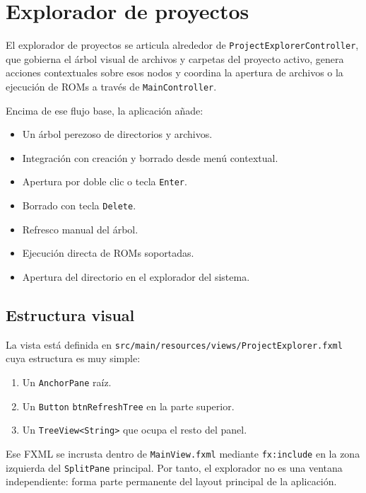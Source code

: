 \documentclass[../../main.tex]{subfiles}
\begin{document}
\clearpage

\section{Explorador de proyectos}

El explorador de proyectos se articula alrededor de \lstinline|ProjectExplorerController|, que gobierna el árbol visual de archivos y carpetas del proyecto activo, genera acciones contextuales sobre esos nodos y coordina la apertura de archivos o la ejecución de ROMs a través de \lstinline|MainController|.

Encima de ese flujo base, la aplicación añade:

\begin{itemize}
    \item Un árbol perezoso de directorios y archivos.
    \item Integración con creación y borrado desde menú contextual.
    \item Apertura por doble clic o tecla \lstinline|Enter|.
    \item Borrado con tecla \lstinline|Delete|.
    \item Refresco manual del árbol.
    \item Ejecución directa de ROMs soportadas.
    \item Apertura del directorio en el explorador del sistema.
\end{itemize}

\subsection{Estructura visual}

La vista está definida en \lstinline|src/main/resources/views/ProjectExplorer.fxml| cuya estructura es muy simple:

\begin{enumerate}
    \item Un \lstinline|AnchorPane| raíz.
    \item Un \lstinline|Button| \lstinline|btnRefreshTree| en la parte superior.
    \item Un \lstinline|TreeView<String>| que ocupa el resto del panel.
\end{enumerate}

Ese FXML se incrusta dentro de \lstinline|MainView.fxml| mediante \lstinline|fx:include| en la zona izquierda del \lstinline|SplitPane| principal. Por tanto, el explorador no es una ventana independiente: forma parte permanente del layout principal de la aplicación.
\end{document}
